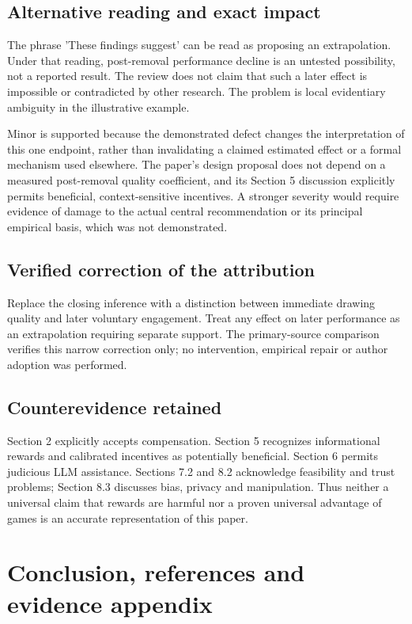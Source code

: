 \documentclass[10pt]{article}
\begin{document}
\subsection*{Alternative reading and exact impact}
The phrase ’These findings suggest’ can be read as proposing an extrapolation. Under that reading, post-removal performance decline is an untested possibility, not a reported result. The review does not claim that such a later effect is impossible or contradicted by other research. The problem is local evidentiary ambiguity in the illustrative example.\par
Minor is supported because the demonstrated defect changes the interpretation of this one endpoint, rather than invalidating a claimed estimated effect or a formal mechanism used elsewhere. The paper’s design proposal does not depend on a measured post-removal quality coefficient, and its Section 5 discussion explicitly permits beneficial, context-sensitive incentives. A stronger severity would require evidence of damage to the actual central recommendation or its principal empirical basis, which was not demonstrated.\par
\subsection*{Verified correction of the attribution}
Replace the closing inference with a distinction between immediate drawing quality and later voluntary engagement. Treat any effect on later performance as an extrapolation requiring separate support. The primary-source comparison verifies this narrow correction only; no intervention, empirical repair or author adoption was performed.\par
\subsection*{Counterevidence retained}
Section 2 explicitly accepts compensation. Section 5 recognizes informational rewards and calibrated incentives as potentially beneficial. Section 6 permits judicious LLM assistance. Sections 7.2 and 8.2 acknowledge feasibility and trust problems; Section 8.3 discusses bias, privacy and manipulation. Thus neither a universal claim that rewards are harmful nor a proven universal advantage of games is an accurate representation of this paper.\par
\section*{Conclusion, references and evidence appendix}
\end{document}
